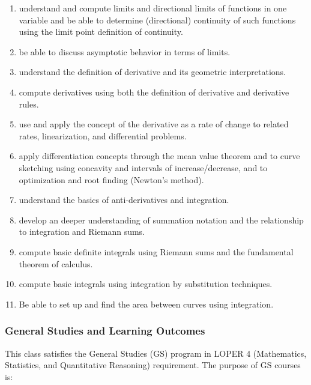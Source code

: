 \documentclass[12pt]{article}
\begin{document}
\begin{enumerate}
    \item  understand and compute limits and directional limits of functions in one variable and be able to determine (directional) continuity of such functions using the limit point definition of continuity.
    
    \item be able to discuss asymptotic behavior in terms of limits.

    \item understand the definition of derivative and its geometric interpretations.

    \item  compute derivatives using both the definition of derivative and derivative rules.

    \item use and apply the concept of the derivative as a rate of change to related rates, linearization, and differential problems.
    
    \item apply differentiation concepts through the mean value theorem and to curve sketching using concavity and intervals of increase/decrease, and to optimization and root finding (Newton’s method).
    
    \item  understand the basics of anti-derivatives and integration.

    \item  develop an deeper understanding of summation notation and the relationship to integration and Riemann sums.
    
    \item compute basic definite integrals using Riemann sums and the fundamental theorem of calculus.

    \item compute basic integrals using integration by substitution techniques.

    \item  Be able to set up and find the area between curves using integration.
    
    \end{enumerate}
\subsubsection*{General Studies and Learning Outcomes}
This class satisfies the General Studies (GS) program in LOPER 4 (Mathematics, Statistics, and Quantitative Reasoning) requirement. The purpose of GS courses is:
\end{document}
